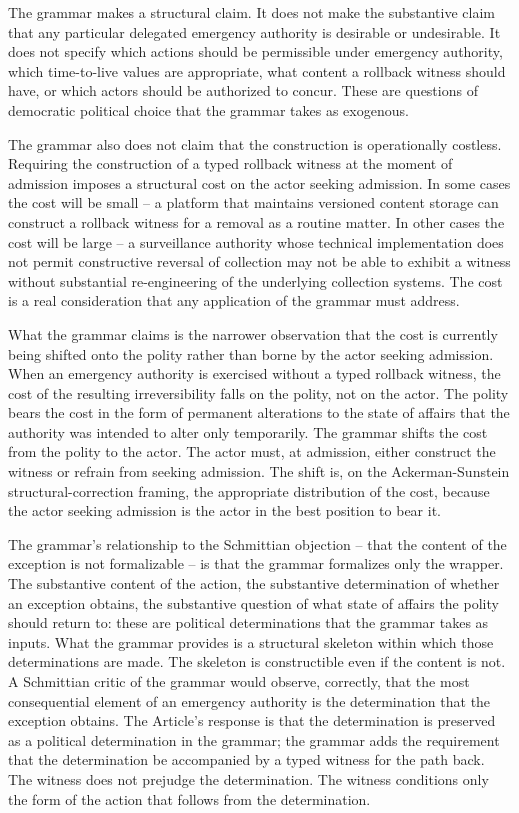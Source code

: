 The grammar makes a structural claim.
It does not make the substantive claim that any particular delegated emergency authority is desirable or undesirable.
It does not specify which actions should be permissible under emergency authority,
which time-to-live values are appropriate, what content a rollback witness should have, or which actors should
be authorized to concur.
These are questions of democratic political choice that the grammar takes as exogenous.

The grammar also does not claim that the construction is operationally costless.
Requiring the construction of a typed rollback witness at the moment of admission imposes a structural cost
on the actor seeking admission.
In some cases the cost will be small -- a platform that maintains versioned content storage can construct
a rollback witness for a removal as a routine matter.
In other cases the cost will be large -- a surveillance authority whose technical implementation does not
permit constructive reversal of collection may not be able to exhibit a witness without substantial re-engineering
of the underlying collection systems.
The cost is a real consideration that any application of the grammar must address.

What the grammar claims is the narrower observation that the cost is currently being shifted onto the polity
rather than borne by the actor seeking admission.
When an emergency authority is exercised without a typed rollback witness,
the cost of the resulting irreversibility falls on the polity, not on the actor.
The polity bears the cost in the form of permanent alterations to the state of affairs that the authority was
intended to alter only temporarily.
The grammar shifts the cost from the polity to the actor.
The actor must, at admission, either construct the witness or refrain from seeking admission.
The shift is, on the Ackerman-Sunstein structural-correction framing, the appropriate distribution of the cost,
because the actor seeking admission is the actor in the best position to bear it.

The grammar's relationship to the Schmittian objection -- that the content of the exception is not formalizable --
is that the grammar formalizes only the wrapper.
The substantive content of the action, the substantive determination of whether an exception obtains,
the substantive question of what state of affairs the polity should return to: these are political determinations
that the grammar takes as inputs.
What the grammar provides is a structural skeleton within which those determinations are made.
The skeleton is constructible even if the content is not.
A Schmittian critic of the grammar would observe, correctly, that the most consequential element of an emergency
authority is the determination that the exception obtains.
The Article's response is that the determination is preserved as a political determination in the grammar;
the grammar adds the requirement that the determination be accompanied by a typed witness for the path back.
The witness does not prejudge the determination.
The witness conditions only the form of the action that follows from the determination.

